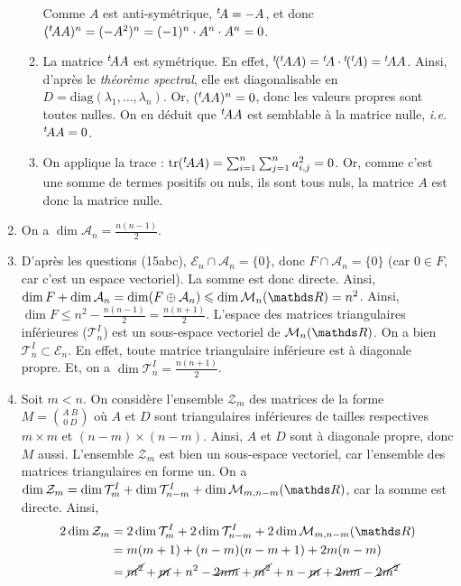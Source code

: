 \documentclass[a4paper]{article}
\begin{document}
\begin{enumerate}
\begin{enumerate}
					Comme $A$\/ est anti-symétrique, ${}^t\! A = -A$, et donc $({}^t\! A A)^n = (- A^2)^n = (-1)^n \cdot A^n \cdot A^n = 0$.
				\item La matrice ${}^t\! A A$\/ est symétrique. En effet, ${}^t\!({}^t\! A A) = {}^t\! A \cdot {}^t\!({}^t\! A) = {}^t\! A A$. Ainsi, d'après le \textit{théorème spectral}, elle est diagonalisable en $D = \mathrm{diag}(\lambda_1, \ldots, \lambda_n)$. Or, $({}^t\! A A)^n = 0$, donc les valeurs propres sont toutes nulles. On en déduit que ${}^t\! A A$\/ est semblable à la matrice nulle, \textit{i.e.} ${}^t\! A A = 0$.
				\item On applique la trace : $\operatorname{tr} ({}^t\! A A) = \sum_{i=1}^n \sum_{j=1}^n a_{i,j}^2 = 0$. Or, comme c'est une somme de termes positifs ou nuls, ils sont tous nuls, la matrice $A$\/ est donc la matrice nulle.
			\end{enumerate}
		\item On a $\dim \mathcal{A}_n = \frac{n(n-1)}{2}$.
		\item D'après les questions (15abc), $\mathcal{E}_n \cap \mathcal{A}_n = \{0\}$, donc $F \cap \mathcal{A}_n = \{0\}$\/ (car $0 \in F$, car c'est un espace vectoriel). La somme est donc directe. Ainsi, $\dim F + \dim \mathcal{A}_n = \dim(F \oplus \mathcal{A}_n) \le \dim \mathcal{M}_n(\R) = n^2$. Ainsi, $\dim F \le n^2 - \frac{n(n-1)}{2} = \frac{n(n+1)}{2}$. L'espace des matrices triangulaires inférieures ($\mathcal{T}^I_n$) est un sous-espace vectoriel de $\mathcal{M}_n(\R)$. On a bien $\mathcal{T}^I_n \subset \mathcal{E}_n$. En effet, toute matrice triangulaire inférieure est à diagonale propre. Et, on a $\dim \mathcal{T}^I_n = \frac{n(n+1)}{2}$.
		\item Soit $m < n$. On considère l'ensemble $\mathcal{Z}_m$\/ des matrices de la forme $M = {A\:B\choose 0\:D}$ où $A$\/ et $D$\/ sont triangulaires inférieures de tailles respectives $m \times m$\/ et $(n-m)\times (n-m)$\/. Ainsi,  $A$\/ et $D$\/ sont à diagonale propre, donc $M$\/ aussi. L'ensemble $\mathcal{Z}_m$\/ est bien un sous-espace vectoriel, car l'ensemble des matrices triangulaires en forme un. On a $\dim \mathcal{Z}_m = \dim\mathcal{T}^I_m + \dim\mathcal{T}^I_{n-m} +\dim \mathcal{M}_{m,n-m}(\R)$, car la somme est directe. Ainsi,
			\begin{align*}
				2\dim \mathcal{Z}_m &= 2 \dim \mathcal{T}^I_m + 2\dim \mathcal{T}^I_{n-m} + 2\dim \mathcal{M}_{m,n-m}(\R)\\
				&= m(m+1) + (n-m)(n-m+1) + 2m(n-m) \\
				&= \cancel{m^2} + \cancel{m} + n^2 -\cancel{2nm} + \cancel{m^2} + n - \cancel{m} + \cancel{2nm} - \cancel{2m^2}  \\

\end{align*}
\end{enumerate}
\end{document}
